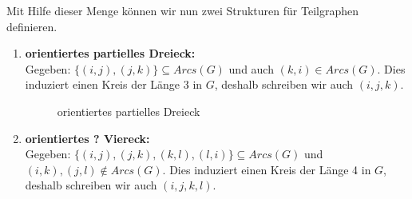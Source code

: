 \noindent Mit Hilfe dieser Menge können wir nun zwei Strukturen für Teilgraphen definieren. 

\begin{definition} \label{Subgraphs}
\begin{enumerate}
	\item \textbf{orientiertes partielles Dreieck:} \\
	Gegeben: $\{(i,j),(j,k)\} \subseteq Arcs(G)$ und auch $(k,i) \in Arcs(G)$. Dies induziert einen Kreis der Länge 3 in $G$, deshalb schreiben wir auch $(i,j,k)$.
	\begin{figure}[htp]
\begin{center}
\caption[orientiertes partielles Dreieck]{orientiertes partielles Dreieck}
  \label{oDreieck}
\end{center}
\end{figure}
	\item \textbf{orientiertes ? Viereck:} \\
	Gegeben: $\{(i,j),(j,k),(k,l),(l,i)\} \subseteq Arcs(G)$ und $(i,k),(j,l) \notin Arcs(G)$. Dies induziert einen Kreis der Länge 4 in $G$, deshalb schreiben wir auch $(i,j,k,l)$. 
	\begin{figure}[htp]
\begin{center}
\end{center}
\end{figure}
\end{enumerate}
\end{definition}
